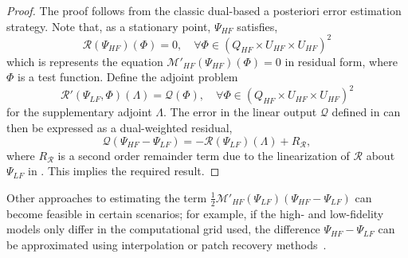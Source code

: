 \documentclass[review,sort&compress]{elsarticle}
\newcommand{\red}[1]{{\color{red}{#1}}}
\theoremstyle{plain} %
\theoremstyle{definition} %
\begin{document}
%
\begin{proof}
%
The proof follows from the classic dual-based a posteriori error estimation strategy. Note that, as a stationary point, $\Psi_{HF}$ satisfies,
%
\begin{equation}
\mathscr{R}(\Psi_{HF})(\Phi)=0,\quad\forall\Phi\in(Q_{HF}\times U_{HF}\times U_{HF})^2
\label{eq:supadjsys}
\end{equation}
%
which is represents the equation $\mathcal{M}'_{HF}(\Psi_{HF})(\Phi)=0$ in residual form, where $\Phi$ is a test function. Define the adjoint problem
%
\begin{equation}
\mathscr{R}'(\Psi_{LF},\Phi)(\Lambda)=\mathcal{Q}(\Phi),\quad\forall\Phi\in(Q_{HF}\times U_{HF}\times U_{HF})^2
\label{eq:superAdjEq}
\end{equation}
%
for the supplementary adjoint $\Lambda$. The error in the linear output $\mathcal{Q}$ defined in  can then be expressed as a dual-weighted residual,
%
\begin{equation}
\label{eq:adjOutErr}
\mathcal{Q}(\Psi_{HF}-\Psi_{LF})=-\mathscr{R}(\Psi_{LF})(\Lambda) + R_{\mathscr{R}},
\end{equation}
%
where $R_{\mathscr{R}}$ is a second order remainder term due to the linearization of $\mathscr{R}$ about $\Psi_{LF}$ in . This implies the required result. %
%
\end{proof}
%

Other approaches to estimating the term $\frac{1}{2}\mathcal{M}'_{HF}(\Psi_{LF})(\Psi_{HF}-\Psi_{LF})$ can become feasible in certain scenarios; for example, if the high- and low-fidelity models only differ in the computational grid used, the difference $\Psi_{HF}-\Psi_{LF}$ can be approximated using interpolation or patch recovery methods~\cite{BecVex05}.
\end{document}
